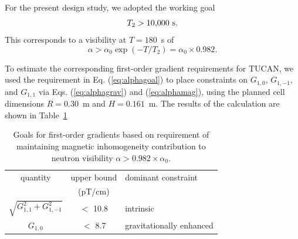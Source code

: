 \documentclass[preprint,12pt]{elsarticle}
\begin{document}
For the present design study, we adopted the working goal
\begin{equation}
  T_2 > 10{,}000~{\rm s}.
  \label{eq:t2goal}
\end{equation}
This corresponds to a visibility at $T=180$~s of
\begin{equation}
  \alpha > \alpha_0 \exp(-T/T_2)=\alpha_0\times 0.982.
  \label{eq:alphagoal}
\end{equation}

To estimate the corresponding first-order gradient requirements for
TUCAN, we used the requirement in Eq. (\ref{eq:alphagoal}) to place
constraints on $G_{1,0}$, $G_{1,-1}$, and $G_{1,1}$ via
Eqs. (\ref{eq:alphagrav}) and (\ref{eq:alphamag}), using the planned
cell dimensions $R=0.30$~m and $H=0.161$~m.  The results of the
calculation are shown in Table~\ref{tab:ggoal}
\begin{table}
  \begin{center}
    \begin{tabular}{ccl}
      quantity & upper bound & dominant constraint\\
               & (pT/cm) & \\\hline
      $\sqrt{G_{1,1}^2+G_{1,-1}^2}$ & $<$ 10.8 & intrinsic\\
      $G_{1,0}$ & $<$ 8.7 & gravitationally enhanced
    \end{tabular}
    \caption{Goals for first-order gradients based on requirement of
      maintaining magnetic inhomogeneity contribution to neutron
      visibility $\alpha>0.982\times\alpha_0$.\label{tab:ggoal}}
  \end{center}
\end{table}
\end{document}
